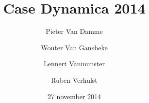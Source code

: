 \title{Case Dynamica 2014}
\date{27 november 2014}
\author{Pieter Van Damme \and Wouter Van Gansbeke \and Lennert Vanmunster \and Ruben Verhulst}

\maketitle